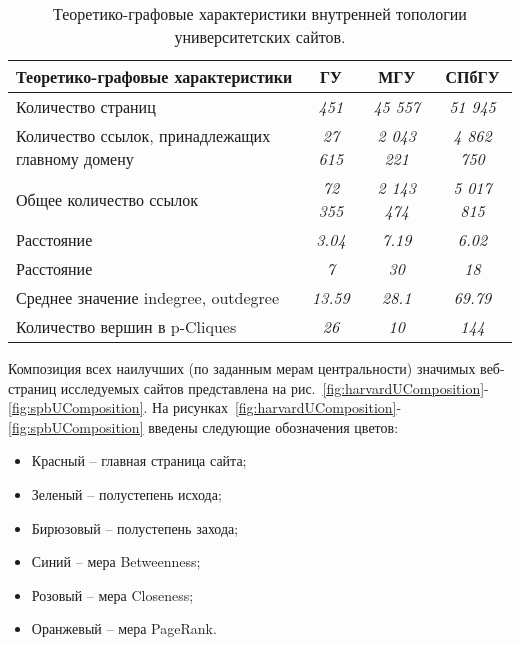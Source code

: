 \begin{table} [htbp]%
	\centering
	\caption{Теоретико-графовые характеристики внутренней топологии университетских сайтов.}%
	\label{tab:uniPagesInnerTopology}%
	\renewcommand{\arraystretch}{1.5}%
	\begin{SingleSpace}
		\begin{tabulary}{\textwidth}{@{}>{\zz}L >{\zz}C >{\zz}C >{\zz}C@{}} %
			\toprule     %
			Теоретико-графовые характеристики & ГУ & МГУ & СПбГУ\\
			\midrule %
			Количество страниц & \textit{451} & \textit{45 557} & \textit{51 945} \\				
			Количество ссылок, принадлежащих главному домену & \textit{27 615} & \textit{2 043 221} & \textit{4 862 750} \\
			Общее количество ссылок & \textit{72 355} & \textit{2 143 474} & \textit{5 017 815} \\
			Расстояние & \textit{3.04} & \textit{7.19} & \textit{6.02} \\
			Расстояние & \textit{7} & \textit{30} & \textit{18} \\
			Среднее значение indegree, outdegree & \textit{13.59} & \textit{28.1} & \textit{69.79} \\
			Количество вершин в p-Cliques & \textit{26} & \textit{10} & \textit{144} \\
			\bottomrule %
		\end{tabulary}%
	\end{SingleSpace}
\end{table}

Композиция всех наилучших (по заданным мерам центральности) значимых веб-страниц исследуемых сайтов представлена на рис.~\cref{fig:harvardUComposition}-\cref{fig:spbUComposition}. На рисунках~\cref{fig:harvardUComposition}-\cref{fig:spbUComposition} введены следующие обозначения цветов: 
\begin{itemize}
	\item Красный -- главная страница сайта; 
	\item  Зеленый -- полустепень исхода; 
	\item Бирюзовый -- полустепень захода; 
	\item Синий -- мера Betweenness; 
	\item Розовый -- мера Closeness; 
	\item Оранжевый -- мера PageRank.
\end{itemize}

